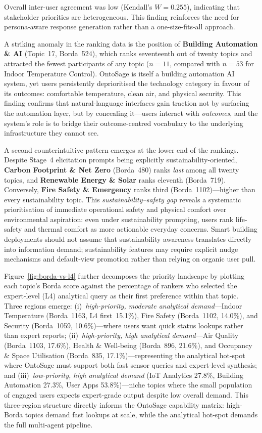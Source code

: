\documentclass[acmsmall]{acmart}
\begin{document}
Overall inter-user agreement was low (Kendall's $W=0.255$), indicating that stakeholder priorities are heterogeneous. This finding reinforces the need for persona-aware response generation rather than a one-size-fits-all approach.

A striking anomaly in the ranking data is the position of \textbf{Building Automation \& AI} (Topic~17, Borda~524), which ranks seventeenth out of twenty topics and attracted the fewest participants of any topic ($n=11$, compared with $n=53$ for Indoor Temperature Control). OntoSage is itself a building automation AI system, yet users persistently deprioritised the technology category in favour of its outcomes: comfortable temperature, clean air, and physical security. This finding confirms that natural-language interfaces gain traction not by surfacing the automation layer, but by concealing it---users interact with \emph{outcomes}, and the system's role is to bridge their outcome-centred vocabulary to the underlying infrastructure they cannot see.

A second counterintuitive pattern emerges at the lower end of the rankings. Despite Stage~4 elicitation prompts being explicitly sustainability-oriented, \textbf{Carbon Footprint \& Net Zero} (Borda~480) ranks \emph{last} among all twenty topics, and \textbf{Renewable Energy \& Solar} ranks eleventh (Borda~719). Conversely, \textbf{Fire Safety \& Emergency} ranks third (Borda~1102)---higher than every sustainability topic. This \emph{sustainability--safety gap} reveals a systematic prioritisation of immediate operational safety and physical comfort over environmental aspiration: even under sustainability prompting, users rank life-safety and thermal comfort as more actionable everyday concerns. Smart building deployments should not assume that sustainability awareness translates directly into information demand; sustainability features may require explicit nudge mechanisms and default-view promotion rather than relying on organic user pull.

Figure~\ref{fig:borda-vs-l4} further decomposes the priority landscape by plotting each topic's Borda score against the percentage of rankers who selected the expert-level (L4) analytical query as their first preference within that topic. Three regions emerge: (i)~\emph{high-priority, moderate analytical demand}---Indoor Temperature (Borda~1163, L4 first~15.1\%), Fire Safety (Borda~1102, 14.0\%), and Security (Borda~1059, 10.6\%)---where users want quick status lookups rather than expert reports; (ii)~\emph{high-priority, high analytical demand}---Air Quality (Borda~1103, 17.6\%), Health \& Well-being (Borda~896, 21.6\%), and Occupancy \& Space Utilisation (Borda~835, 17.1\%)---representing the analytical hot-spot where OntoSage must support both fast sensor queries and expert-level synthesis; and (iii)~\emph{low-priority, high analytical demand} (IoT Analytics 27.8\%, Building Automation 27.3\%, User Apps 53.8\%)---niche topics where the small population of engaged users expects expert-grade output despite low overall demand. This three-region structure directly informs the OntoSage capability matrix: high-Borda topics demand fast lookups at scale, while the analytical hot-spot demands the full multi-agent pipeline.
\end{document}
